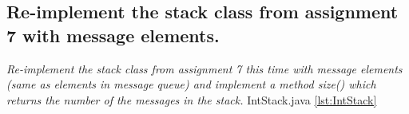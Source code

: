 \documentclass[main.tex]{subfiles}
\begin{document}
\subsection*{Re-implement the stack class from assignment 7 with message elements.}
\textit{Re-implement the stack class from assignment 7 this time with message elements (same as
elements in message queue) and implement a method size() which returns the number of the
messages in the stack.}
IntStack.java \ref{lst:IntStack}
\end{document}
